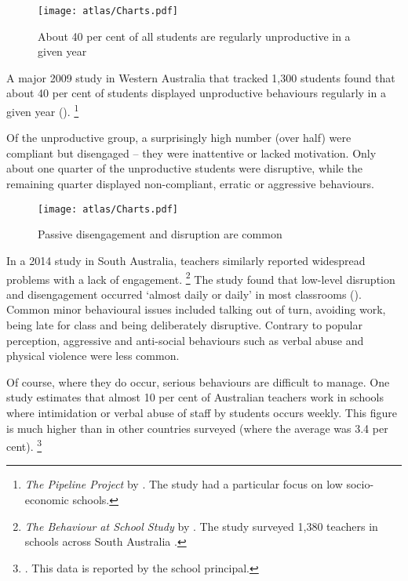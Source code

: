 \documentclass[FrontPage]{grattan}
\begin{document}
\begin{figure}
\caption{About 40 per cent of all students are regularly unproductive in a given year\label{fig:40-pc-regularly-unproductive}}%
\texttt{[image: atlas/Charts.pdf]}
%
{\textcite{Angus2009PipelineProject}}
\end{figure}

A major 2009 study in Western Australia that tracked 1,300 students found that about 40 per cent of students displayed unproductive behaviours regularly in a given year  ().%
    \footnote{\emph{The Pipeline Project} by \textcite{Angus2009PipelineProject}. The study had a  particular focus on low socio-economic schools.} 

Of the unproductive group, a surprisingly high number (over half) were compliant but disengaged – they were inattentive or lacked motivation. Only about one quarter of the unproductive students were disruptive, while the remaining quarter displayed non-compliant, erratic or aggressive behaviours.

\begin{figure}
\caption{Passive disengagement and disruption are common\label{fig:disengagement-disruption-common}}%
\texttt{[image: atlas/Charts.pdf]}
\end{figure}

In a 2014 study in South Australia, teachers similarly reported widespread problems with a lack of engagement.%
    \footnote{\emph{The Behaviour at School Study} 
    by \textcite{Sullivan2014PunishThemEngage}. The study surveyed 1,380 teachers in schools across South Australia .}
The study found that low-level disruption and disengagement occurred ‘almost daily or daily' in most classrooms  ().
Common minor behavioural issues included talking out of turn, avoiding work, being late for class and being deliberately disruptive. Contrary to popular perception, aggressive and anti-social behaviours such as verbal abuse and physical violence were less common. %

Of course, where they do occur, serious behaviours are difficult to manage. One study estimates that almost 10 per cent of Australian teachers work in schools where intimidation or verbal abuse of staff by students occurs weekly. This figure is much higher than in other countries surveyed (where the average was 3.4 per cent).%
    \footnote{\textcite{Freeman2014AustralianTeachersLearning}. This data is reported by the school principal.} 
\end{document}
